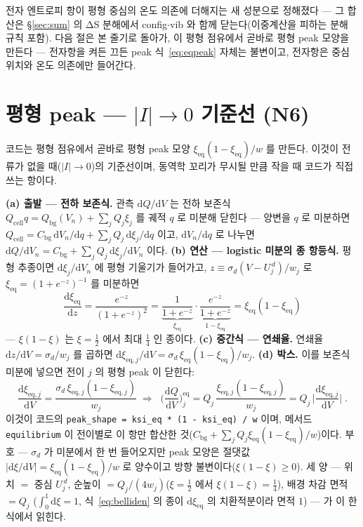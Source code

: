 \documentclass[11pt,a4paper]{article}
\newcommand{\dd}{\mathrm{d}}
\newcommand{\eq}{\mathrm{eq}}
\newcommand{\cell}{\mathrm{cell}}
\newcommand{\bg}{\mathrm{bg}}
\newcommand{\code}[1]{\texttt{#1}}
\begin{document}
전자 엔트로피 항이 평형 중심의 온도 의존에 더해지는 새 성분으로 정해졌다 — 그 합산은 \S\ref{sec:sum} 의 ΔS 분해에서
config$\cdot$vib 와 함께 닫는다(이중계산을 피하는 분해 규칙 포함). 다음 절은 본 줄기로 돌아가, 이 평형 점유에서 곧바로
평형 peak 모양을 만든다 — 전자항을 켜든 끄든 peak 식~\eqref{eq:eqpeak} 자체는 불변이고, 전자항은 중심 위치와
온도 의존에만 들어간다.

\section{평형 peak — $|I|\to0$ 기준선 (N6)}\label{sec:eqpeak}
코드는 평형 점유에서 곧바로 평형 peak 모양 $\xi_\eq(1-\xi_\eq)/w$ 를 만든다. 이것이 전류가 없을 때($|I|\to0$)의
기준선이며, 동역학 꼬리가 무시될 만큼 작을 때 코드가 직접 쓰는 항이다.

\textbf{(a) 출발 — 전하 보존식.} 관측 $\dd Q/\dd V$ 는 전하 보존식 $Q_\cell q=Q_\bg(V_n)+\sum_jQ_j\xi_j$ 를 궤적
$q$ 로 미분해 닫힌다 — 양변을 $q$ 로 미분하면 $Q_\cell=C_\bg\,\dd V_n/\dd q+\sum_jQ_j\,\dd\xi_j/\dd q$ 이고,
$\dd V_n/\dd q$ 로 나누면 $\dd Q/\dd V_n=C_\bg+\sum_jQ_j\,\dd\xi_j/\dd V_n$ 이다. \textbf{(b) 연산 — logistic
미분의 종 항등식.} 평형 추종이면 $\dd\xi_j/\dd V_n$ 에 평형 기울기가 들어가고, $z\equiv\sigma_d(V-U_j^{\,d})/w_j$ 로
$\xi_\eq=(1+e^{-z})^{-1}$ 를 미분하면
\begin{equation}
\frac{\dd\xi_\eq}{\dd z}=\frac{e^{-z}}{(1+e^{-z})^2}
=\underbrace{\frac{1}{1+e^{-z}}}_{\xi_\eq}\cdot\underbrace{\frac{e^{-z}}{1+e^{-z}}}_{1-\xi_\eq}
=\xi_\eq(1-\xi_\eq)
\label{eq:belliden}
\end{equation}
— $\xi(1-\xi)$ 는 $\xi=\tfrac12$ 에서 최대 $\tfrac14$ 인 종이다. \textbf{(c) 중간식 — 연쇄율.} 연쇄율
$\dd z/\dd V=\sigma_d/w_j$ 를 곱하면 $\dd\xi_{\eq,j}/\dd V=\sigma_d\,\xi_\eq(1-\xi_\eq)/w_j$. \textbf{(d) 박스.}
이를 보존식 미분에 넣으면 전이 $j$ 의 평형 peak 이 닫힌다:
\begin{equation}
\frac{\dd\xi_{\eq,j}}{\dd V}=\frac{\sigma_d\,\xi_{\eq,j}(1-\xi_{\eq,j})}{w_j}
\;\Longrightarrow\;
\boxed{\;\Big(\frac{\dd Q}{\dd V}\Big)^\eq_j
=Q_j\,\frac{\xi_{\eq,j}(1-\xi_{\eq,j})}{w_j}
=Q_j\,\Big|\frac{\dd\xi_{\eq,j}}{\dd V}\Big|\;.}
\label{eq:eqpeak}
\end{equation}
이것이 코드의 \code{peak\_shape = ksi\_eq * (1 - ksi\_eq) / w} 이며, 메서드 \code{equilibrium} 이 전이별로 이 항만
합산한 것($C_\bg+\sum_jQ_j\xi_\eq(1-\xi_\eq)/w$)이다. 부호 — $\sigma_d$ 가 미분에서 한 번 들어오지만 peak 모양은
절댓값 $|\dd\xi/\dd V|=\xi_\eq(1-\xi_\eq)/w$ 로 양수이고 방향 불변이다($\xi(1-\xi)\ge0$). 세 양 — 위치 $=$ 중심
$U_j^{\,d}$, 순높이 $=Q_j/(4w_j)$($\xi=\tfrac12$ 에서 $\xi(1-\xi)=\tfrac14$), 배경 차감 면적 $=Q_j$
($\int_0^1\dd\xi=1$, 식~\eqref{eq:belliden} 의 종이 $\dd\xi_\eq$ 의 치환적분이라 면적 $1$) — 가 이 한 식에서 읽힌다.
\end{document}
